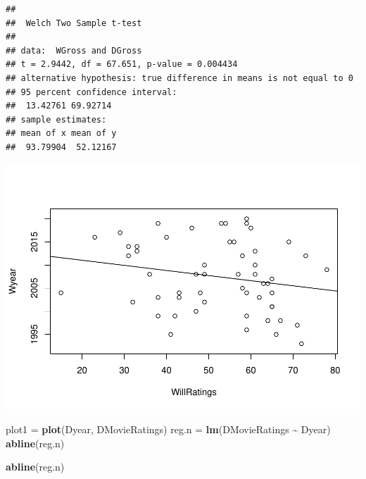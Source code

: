 \documentclass[]{article}
\newenvironment{Shaded}{\begin{snugshade}}{\end{snugshade}}
\newcommand{\KeywordTok}[1]{\textcolor[rgb]{0.13,0.29,0.53}{\textbf{#1}}}
\newcommand{\NormalTok}[1]{#1}
\newcommand{\OperatorTok}[1]{\textcolor[rgb]{0.81,0.36,0.00}{\textbf{#1}}}
\newcommand{\StringTok}[1]{\textcolor[rgb]{0.31,0.60,0.02}{#1}}
\begin{document}
\begin{verbatim}
## 
##  Welch Two Sample t-test
## 
## data:  WGross and DGross
## t = 2.9442, df = 67.651, p-value = 0.004434
## alternative hypothesis: true difference in means is not equal to 0
## 95 percent confidence interval:
##  13.42761 69.92714
## sample estimates:
## mean of x mean of y 
##  93.79904  52.12167
\end{verbatim}

\begin{Shaded}
\end{Shaded}

\includegraphics{Denzel-v-Will-data_files/figure-latex/unnamed-chunk-5-5.pdf}

\begin{Shaded}
\begin{Highlighting}[]
\NormalTok{plot1 =}\StringTok{ }\KeywordTok{plot}\NormalTok{(Dyear, DMovieRatings)}
\NormalTok{reg.n =}\StringTok{ }\KeywordTok{lm}\NormalTok{(DMovieRatings }\OperatorTok{\textasciitilde{}}\StringTok{ }\NormalTok{Dyear)}
\KeywordTok{abline}\NormalTok{(reg.n)}

\KeywordTok{abline}\NormalTok{(reg.n)}
\end{Highlighting}
\end{Shaded}
\end{document}
